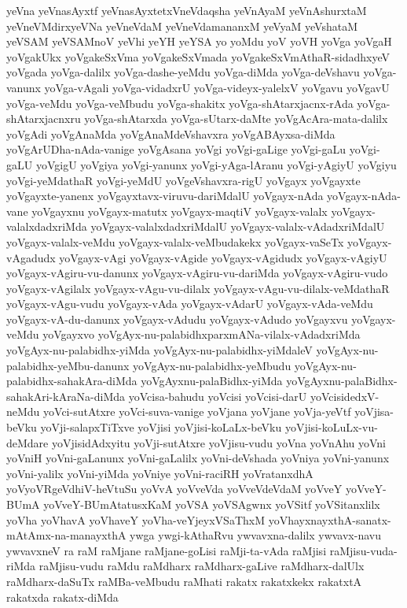 {yeVna
yeVnasAyxtf
yeVnasAyxtetxVneVdaqsha
yeVnAyaM
yeVnAshurxtaM
yeVneVMdirxyeVNa
yeVneVdaM
yeVneVdamananxM
yeVyaM
yeVshataM
yeVSAM
yeVSAMnoV
yeVhi
yeYH
yeYSA
yo
yoMdu
yoV
yoVH
yoVga
yoVgaH
yoVgakUkx
yoVgakeSxVma
yoVgakeSxVmada
yoVgakeSxVmAthaR-sidadhxyeV
yoVgada
yoVga-dalilx
yoVga-dashe-yeMdu
yoVga-diMda
yoVga-deVshavu
yoVga-vanunx
yoVga-vAgali
yoVga-vidadxrU
yoVga-videyx-yalelxV
yoVgavu
yoVgavU
yoVga-veMdu
yoVga-veMbudu
yoVga-shakitx
yoVga-shAtarxjacnx-rAda
yoVga-shAtarxjacnxru
yoVga-shAtarxda
yoVga-sUtarx-daMte
yoVgAcAra-mata-dalilx
yoVgAdi
yoVgAnaMda
yoVgAnaMdeVshavxra
yoVgABAyxsa-diMda
yoVgArUDha-nAda-vanige
yoVgAsana
yoVgi
yoVgi-gaLige
yoVgi-gaLu
yoVgi-gaLU
yoVgigU
yoVgiya
yoVgi-yanunx
yoVgi-yAga-lAranu
yoVgi-yAgiyU
yoVgiyu
yoVgi-yeMdathaR
yoVgi-yeMdU
yoVgeVshavxra-rigU
yoVgayx
yoVgayxte
yoVgayxte-yanenx
yoVgayxtavx-viruvu-dariMdalU
yoVgayx-nAda
yoVgayx-nAda-vane
yoVgayxnu
yoVgayx-matutx
yoVgayx-maqtiV
yoVgayx-valalx
yoVgayx-valalxdadxriMda
yoVgayx-valalxdadxriMdalU
yoVgayx-valalx-vAdadxriMdalU
yoVgayx-valalx-veMdu
yoVgayx-valalx-veMbudakekx
yoVgayx-vaSeTx
yoVgayx-vAgadudx
yoVgayx-vAgi
yoVgayx-vAgide
yoVgayx-vAgidudx
yoVgayx-vAgiyU
yoVgayx-vAgiru-vu-danunx
yoVgayx-vAgiru-vu-dariMda
yoVgayx-vAgiru-vudo
yoVgayx-vAgilalx
yoVgayx-vAgu-vu-dilalx
yoVgayx-vAgu-vu-dilalx-veMdathaR
yoVgayx-vAgu-vudu
yoVgayx-vAda
yoVgayx-vAdarU
yoVgayx-vAda-veMdu
yoVgayx-vA-du-danunx
yoVgayx-vAdudu
yoVgayx-vAdudo
yoVgayxvu
yoVgayx-veMdu
yoVgayxvo
yoVgAyx-nu-palabidhxparxmANa-vilalx-vAdadxriMda
yoVgAyx-nu-palabidhx-yiMda
yoVgAyx-nu-palabidhx-yiMdaleV
yoVgAyx-nu-palabidhx-yeMbu-danunx
yoVgAyx-nu-palabidhx-yeMbudu
yoVgAyx-nu-palabidhx-sahakAra-diMda
yoVgAyxnu-palaBidhx-yiMda
yoVgAyxnu-palaBidhx-sahakAri-kAraNa-diMda
yoVcisa-bahudu
yoVcisi
yoVcisi-darU
yoVcisidedxV-neMdu
yoVci-sutAtxre
yoVci-suva-vanige
yoVjana
yoVjane
yoVja-yeVtf
yoVjisa-beVku
yoVji-salapxTiTxve
yoVjisi
yoVjisi-koLaLx-beVku
yoVjisi-koLuLx-vu-deMdare
yoVjisidAdxyitu
yoVji-sutAtxre
yoVjisu-vudu
yoVna
yoVnAhu
yoVni
yoVniH
yoVni-gaLanunx
yoVni-gaLalilx
yoVni-deVshada
yoVniya
yoVni-yanunx
yoVni-yalilx
yoVni-yiMda
yoVniye
yoVni-raciRH
yoVratanxdhA
yoVyoVRgeVdhiV-heVtuSu
yoVvA
yoVveVda
yoVveVdeVdaM
yoVveY
yoVveY-BUmA
yoVveY-BUmAtatusxKaM
yoVSA
yoVSAgwnx
yoVSitf
yoVSitanxlilx
yoVha
yoVhavA
yoVhaveY
yoVha-veYjeyxVSaThxM
yoVhayxnayxthA-sanatx-mAtAmx-na-manayxthA
ywga
ywgi-kAthaRvu
ywvavxna-dalilx
ywvavx-navu
ywvavxneV
ra
raM
raMjane
raMjane-goLisi
raMji-ta-vAda
raMjisi
raMjisu-vuda-riMda
raMjisu-vudu
raMdu
raMdharx
raMdharx-gaLive
raMdharx-dalUlx
raMdharx-daSuTx
raMBa-veMbudu
raMhati
rakatx
rakatxkekx
rakatxtA
rakatxda
rakatx-diMda
}
